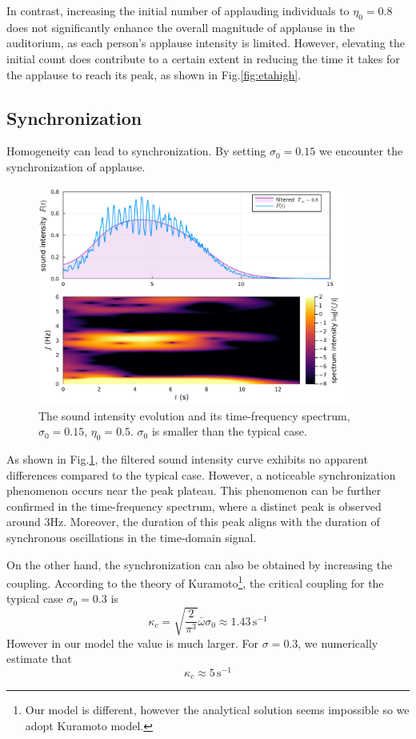 \documentclass[UTF8,a4paper,11pt]{ctexart}
\begin{document}
In contrast, increasing the initial number of applauding individuals to $η_0 = 0.8$ does not significantly enhance the overall magnitude of applause in the auditorium, as each person's applause intensity is limited. However, elevating the initial count does contribute to a certain extent in reducing the time it takes for the applause to reach its peak, as shown in Fig.\ref{fig:etahigh}.

\subsection{Synchronization}

Homogeneity can lead to synchronization. By setting $σ_0 = 0.15$ we encounter the synchronization of applause.

\begin{figure}[H]
    \centering
    \includegraphics[width=0.9\textwidth]{sync.pdf}
    \caption{The sound intensity evolution and its time-frequency spectrum, $σ_0 = 0.15$, $η_0=0.5$. $σ_0$ is smaller than the typical case.}
    \label{fig:sync}
\end{figure}

As shown in Fig.\ref{fig:sync}, the filtered sound intensity curve exhibits no apparent differences compared to the typical case. However, a noticeable synchronization phenomenon occurs near the peak plateau. This phenomenon can be further confirmed in the time-frequency spectrum, where a distinct peak is observed around 3Hz. Moreover, the duration of this peak aligns with the duration of synchronous oscillations in the time-domain signal.

On the other hand, the synchronization can also be obtained by increasing the coupling. According to the theory of Kuramoto\footnote{Our model is different, however the analytical solution seems impossible so we adopt Kuramoto model.}, the critical coupling for the typical case $σ_0 = 0.3$ is
\begin{equation}
    κ_c = \sqrt{\frac{2}{π^3}} \bar{ω} σ_0 ≈ 1.43 \,\mathrm{s^{-1}}
\end{equation}
However in our model the value is much larger. For $σ=0.3$, we numerically estimate that
\begin{equation}
    κ_c ≈ 5 \, \mathrm{s^{-1}}
\end{equation}
\end{document}

